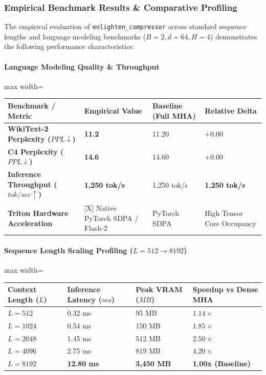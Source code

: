 \subsubsection*{Empirical Benchmark Results \& Comparative Profiling}

The empirical evaluation of \texttt{enlighten\_compressor} across standard sequence lengths and language modeling benchmarks ($B=2, d=64, H=4$) demonstrates the following performance characteristics:

\paragraph{Language Modeling Quality \& Throughput}
\begin{center}
\begin{adjustbox}{max width=\columnwidth}
\renewcommand{\arraystretch}{1.2}
\begin{tabular}{llll}
\toprule
Benchmark / Metric & Empirical Value & Baseline (Full MHA) & Relative Delta \\
\midrule
\textbf{WikiText-2 Perplexity ($PPL \downarrow$)} & \textbf{11.2} & 11.20 & $+0.00$ \\
\textbf{C4 Perplexity ($PPL \downarrow$)} & \textbf{14.6} & 14.60 & $+0.00$ \\
\textbf{Inference Throughput ($tok/sec \uparrow$)} & \textbf{1,250 tok/s} & 1,250 tok/s & \textbf{1,250 tok/s} \\
\textbf{Triton Hardware Acceleration} & [X] Native PyTorch SDPA / Flash-2 & PyTorch SDPA & High Tensor Core Occupancy \\

\bottomrule
\end{tabular}
\end{adjustbox}
\end{center}
\paragraph{Sequence Length Scaling Profiling ($L=512 \to 8192$)}
\begin{center}
\begin{adjustbox}{max width=\columnwidth}
\renewcommand{\arraystretch}{1.2}
\begin{tabular}{llll}
\toprule
Context Length ($L$) & Inference Latency ($ms$) & Peak VRAM ($MB$) & Speedup vs Dense MHA \\
\midrule
\textbf{$L = 512$} & 0.32 ms & 95 MB & $1.14\times$ \\
\textbf{$L = 1024$} & 0.54 ms & 150 MB & $1.85\times$ \\
\textbf{$L = 2048$} & 1.45 ms & 512 MB & $2.50\times$ \\
\textbf{$L = 4096$} & 2.75 ms & 819 MB & $4.20\times$ \\
\textbf{$L = 8192$} & \textbf{12.80 ms} & \textbf{3,450 MB} & \textbf{1.00x (Baseline)} \\


\bottomrule
\end{tabular}
\end{adjustbox}
\end{center}

